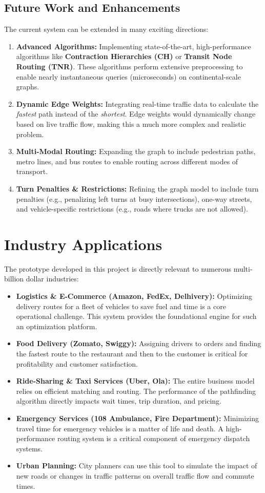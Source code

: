 \documentclass[12pt, a4paper]{report}
\begin{document}
\subsection{Future Work and Enhancements}
The current system can be extended in many exciting directions:
\begin{enumerate}
    \item \textbf{Advanced Algorithms:} Implementing state-of-the-art, high-performance algorithms like \textbf{Contraction Hierarchies (CH)} or \textbf{Transit Node Routing (TNR)}. These algorithms perform extensive preprocessing to enable nearly instantaneous queries (microseconds) on continental-scale graphs.
    \item \textbf{Dynamic Edge Weights:} Integrating real-time traffic data to calculate the \textit{fastest} path instead of the \textit{shortest}. Edge weights would dynamically change based on live traffic flow, making this a much more complex and realistic problem.
    \item \textbf{Multi-Modal Routing:} Expanding the graph to include pedestrian paths, metro lines, and bus routes to enable routing across different modes of transport.
    \item \textbf{Turn Penalties \& Restrictions:} Refining the graph model to include turn penalties (e.g., penalizing left turns at busy intersections), one-way streets, and vehicle-specific restrictions (e.g., roads where trucks are not allowed).
\end{enumerate}

\section{Industry Applications}
The prototype developed in this project is directly relevant to numerous multi-billion dollar industries:
\begin{itemize}
    \item \textbf{Logistics \& E-Commerce (Amazon, FedEx, Delhivery):} Optimizing delivery routes for a fleet of vehicles to save fuel and time is a core operational challenge. This system provides the foundational engine for such an optimization platform.
    \item \textbf{Food Delivery (Zomato, Swiggy):} Assigning drivers to orders and finding the fastest route to the restaurant and then to the customer is critical for profitability and customer satisfaction.
    \item \textbf{Ride-Sharing \& Taxi Services (Uber, Ola):} The entire business model relies on efficient matching and routing. The performance of the pathfinding algorithm directly impacts wait times, trip duration, and pricing.
    \item \textbf{Emergency Services (108 Ambulance, Fire Department):} Minimizing travel time for emergency vehicles is a matter of life and death. A high-performance routing system is a critical component of emergency dispatch systems.
    \item \textbf{Urban Planning:} City planners can use this tool to simulate the impact of new roads or changes in traffic patterns on overall traffic flow and commute times.
\end{itemize}
\end{document}
